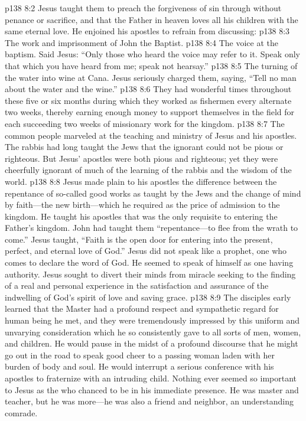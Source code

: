 \vs p138 8:2 Jesus taught them to preach the forgiveness of sin through  without penance or sacrifice, and that the Father in heaven loves all his children with the same eternal love. He enjoined his apostles to refrain from discussing:
\pc \vs p138 8:3 \bibnobreakspace The work and imprisonment of John the Baptist.
\pc \vs p138 8:4 \bibnobreakspace The voice at the baptism. Said Jesus: \textcolor{ubdarkred}{“Only those who heard the voice may refer to it. Speak only that which you have heard from me; speak not hearsay.”}
\pc \vs p138 8:5 \bibnobreakspace The turning of the water into wine at Cana. Jesus seriously charged them, saying, \textcolor{ubdarkred}{“Tell no man about the water and the wine.”}
\pc \vs p138 8:6 They had wonderful times throughout these five or six months during which they worked as fishermen every alternate two weeks, thereby earning enough money to support themselves in the field for each succeeding two weeks of missionary work for the kingdom.
\vs p138 8:7 The common people marveled at the teaching and ministry of Jesus and his apostles. The rabbis had long taught the Jews that the ignorant could not be pious or righteous. But Jesus’ apostles were both pious and righteous; yet they were cheerfully ignorant of much of the learning of the rabbis and the wisdom of the world.
\pc \vs p138 8:8 Jesus made plain to his apostles the difference between the repentance of so\hyp{}called good works as taught by the Jews and the change of mind by faith---the new birth---which he required as the price of admission to the kingdom. He taught his apostles that  was the only requisite to entering the Father’s kingdom. John had taught them “repentance---to flee from the wrath to come.” Jesus taught, \textcolor{ubdarkred}{“Faith is the open door for entering into the present, perfect, and eternal love of God.”} Jesus did not speak like a prophet, one who comes to declare the word of God. He seemed to speak of himself as one having authority. Jesus sought to divert their minds from miracle seeking to the finding of a real and personal experience in the satisfaction and assurance of the indwelling of God’s spirit of love and saving grace.\plusone
\vs p138 8:9 The disciples early learned that the Master had a profound respect and sympathetic regard for  human being he met, and they were tremendously impressed by this uniform and unvarying consideration which he so consistently gave to all sorts of men, women, and children. He would pause in the midst of a profound discourse that he might go out in the road to speak good cheer to a passing woman laden with her burden of body and soul. He would interrupt a serious conference with his apostles to fraternize with an intruding child. Nothing ever seemed so important to Jesus as the  who chanced to be in his immediate presence. He was master and teacher, but he was more---he was also a friend and neighbor, an understanding comrade.
